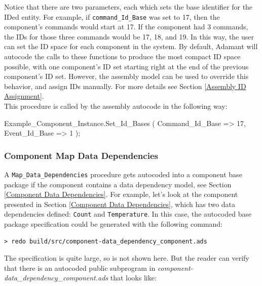 Notice that there are two parameters, each which sets the base identifier for the IDed entity. For example, if \texttt{command\_Id\_Base} was set to 17, then the component's commands would start at 17. If the component had 3 commands, the IDs for those three commands would be 17, 18, and 19. In this way, the user can set the ID space for each component in the system. By default, Adamant will autocode the calls to these functions to produce the most compact ID space possible, with one component's ID set starting right at the end of the previous component's ID set. However, the assembly model can be used to override this behavior, and assign IDs manually. For more details see Section \ref{Assembly ID Assignment}. \\

This procedure is called by the assembly autocode in the following way:

\vspace{5mm} %
\begin{adacode}
  Example_Component_Instance.Set_Id_Bases (
    Command_Id_Base => 17,
    Event_Id_Base => 1
  );
\end{adacode}
\vspace{5mm} %

\subsubsection{Component Map Data Dependencies} \label{Component Set Data Dependency IDs}

A \texttt{Map\_Data\_Dependencies} procedure gets autocoded into a component base package if the component contains a data dependency model, see Section \ref{Component Data Dependencies}. For example, let's look at the component presented in Section \ref{Component Data Dependencies}, which has two data dependencies defined: \texttt{Count} and \texttt{Temperature}. In this case, the autocoded base package specification could be generated with the following command:

\vspace{5mm} %
\begin{verbatim}
> redo build/src/component-data_dependency_component.ads
\end{verbatim}
\vspace{5mm} %

The specification is quite large, so is not shown here. But the reader can verify that there is an autocoded public subprogram in \textit{component-data\_dependency\_component.ads} that looks like:

